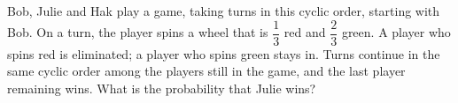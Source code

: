 Bob, Julie and Hak play a game, taking turns in this cyclic order, starting with Bob. On a turn, the player spins a wheel that is $\dfrac13$ red and $\dfrac23$ green. A player who spins red is eliminated; a player who spins green stays in. Turns continue in the same cyclic order among the players still in the game, and the last player remaining wins. What is the probability that Julie wins?
